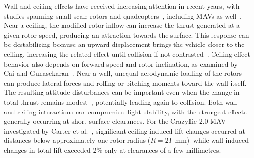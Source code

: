 \documentclass[journal]{IEEEtran}
\begin{document}
Wall and ceiling effects have received increasing attention in recent years, with studies spanning small-scale rotors and quadcopters~\cite{Franzetti2024,Cai2024}, including MAVs as well~\cite{Carter2021}. Near a ceiling, the modified rotor inflow can increase the thrust generated at a given rotor speed, producing an attraction towards the surface. This response can be destabilizing because an upward displacement brings the vehicle closer to the ceiling, increasing the related effect until collision if not contrasted~\cite{Carter2021}. Ceiling-effect behavior also depends on forward speed and rotor inclination, as examined by Cai and Gunasekaran~\cite{Cai2024}.
Near a wall, unequal aerodynamic loading of the rotors can produce lateral forces and rolling or pitching moments toward the wall itself. The resulting attitude disturbances can be important even when the change in total thrust remains modest~\cite{Carter2021,Franzetti2024}, potentially leading again to collision. 
Both wall and ceiling interactions can compromise flight stability, with the strongest effects generally occurring at short surface clearances. For the Crazyflie 2.0 MAV investigated by Carter et al.~\cite{Carter2021}, significant ceiling-induced lift changes occurred at distances below approximately one rotor radius ($R=23$~mm), while wall-induced changes in total lift exceeded 2\% only at clearances of a few millimetres.
\end{document}
